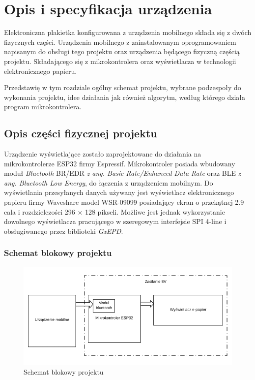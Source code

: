 \documentclass[a4paper,12pt, twoside]{article}
\begin{document}
    \vspace{1cm}
	\section{Opis i specyfikacja urządzenia}
	Elektroniczna plakietka konfigurowana z urządzenia mobilnego składa się z dwóch fizycznych części. Urządzenia mobilnego z zainstalowanym oprogramowaniem napisanym do obsługi tego projektu oraz urządzenia będącego fizyczną częścią projektu. Składającego się z mikrokontrolera oraz wyświetlacza w technologii elektronicznego papieru.

    Przedstawię w tym rozdziale ogólny schemat projektu, wybrane podzespoły do wykonania projektu, idee działania jak również algorytm, według którego działa program mikrokontrolera.
    \vspace{.5cm}
    \subsection{Opis części fizycznej projektu}
    Urządzenie wyświetlające zostało zaprojektowane do działania na mikrokontrolerze ESP32 firmy Espressif. Mikrokontroler posiada wbudowany moduł \textit{Bluetooth} BR/EDR \textit{z ang. Basic Rate/Enhanced Data Rate}\cite{edr} oraz BLE \textit{z ang. Bluetooth Low Energy}\cite{ble}, do łączenia z urządzeniem mobilnym. Do wyświetlania przesyłanych danych używany jest wyświetlacz elektronicznego papieru firmy Waveshare model WSR-09099 posiadający ekran o przekątnej 2.9 cala i rozdzielczości 296 × 128 pikseli. Możliwe jest jednak wykorzystanie dowolnego wyświetlacza 
    pracującego w szeregowym interfejsie SPI 4-line i obsługiwanego przez biblioteki \textit{GxEPD}\cite{gxepd}.
    \vspace{.5cm}
    \subsubsection{Schemat blokowy projektu}
    \begin{figure}[H]
	        \centering
			\vspace{.5cm}
			\includegraphics[width=14cm]{images/rys_7schemat_blokowy.png}
			\vspace{.5cm}
			\caption{Schemat blokowy projektu}
            \label{fig:block}
	\end{figure}
	\vspace{.5cm}
\end{document}
